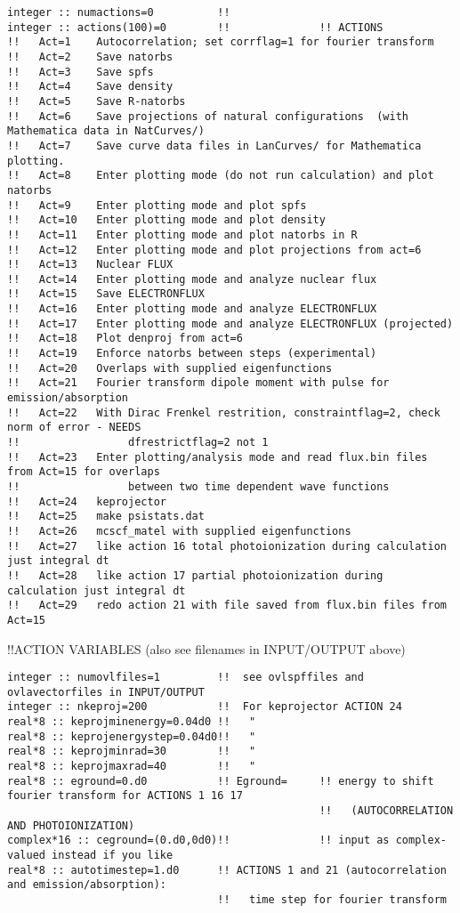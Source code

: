 \begin{verbatim}
integer :: numactions=0          !! 
integer :: actions(100)=0        !!              !! ACTIONS
!!   Act=1    Autocorrelation; set corrflag=1 for fourier transform
!!   Act=2    Save natorbs
!!   Act=3    Save spfs
!!   Act=4    Save density
!!   Act=5    Save R-natorbs
!!   Act=6    Save projections of natural configurations  (with Mathematica data in NatCurves/)
!!   Act=7    Save curve data files in LanCurves/ for Mathematica plotting.
!!   Act=8    Enter plotting mode (do not run calculation) and plot natorbs 
!!   Act=9    Enter plotting mode and plot spfs
!!   Act=10   Enter plotting mode and plot density
!!   Act=11   Enter plotting mode and plot natorbs in R
!!   Act=12   Enter plotting mode and plot projections from act=6
!!   Act=13   Nuclear FLUX 
!!   Act=14   Enter plotting mode and analyze nuclear flux
!!   Act=15   Save ELECTRONFLUX
!!   Act=16   Enter plotting mode and analyze ELECTRONFLUX 
!!   Act=17   Enter plotting mode and analyze ELECTRONFLUX (projected)
!!   Act=18   Plot denproj from act=6
!!   Act=19   Enforce natorbs between steps (experimental)
!!   Act=20   Overlaps with supplied eigenfunctions
!!   Act=21   Fourier transform dipole moment with pulse for emission/absorption
!!   Act=22   With Dirac Frenkel restrition, constraintflag=2, check norm of error - NEEDS
!!                 dfrestrictflag=2 not 1
!!   Act=23   Enter plotting/analysis mode and read flux.bin files from Act=15 for overlaps
!!                 between two time dependent wave functions
!!   Act=24   keprojector
!!   Act=25   make psistats.dat
!!   Act=26   mcscf_matel with supplied eigenfunctions 
!!   Act=27   like action 16 total photoionization during calculation just integral dt
!!   Act=28   like action 17 partial photoionization during calculation just integral dt
!!   Act=29   redo action 21 with file saved from flux.bin files from Act=15
\end{verbatim}
!!{\large \quad ACTION VARIABLES (also see filenames in INPUT/OUTPUT above)}
\begin{verbatim}
integer :: numovlfiles=1         !!  see ovlspffiles and ovlavectorfiles in INPUT/OUTPUT
integer :: nkeproj=200           !!  For keprojector ACTION 24
real*8 :: keprojminenergy=0.04d0 !!   "
real*8 :: keprojenergystep=0.04d0!!   "
real*8 :: keprojminrad=30        !!   "
real*8 :: keprojmaxrad=40        !!   "
real*8 :: eground=0.d0           !! Eground=     !! energy to shift fourier transform for ACTIONS 1 16 17
                                                 !!   (AUTOCORRELATION AND PHOTOIONIZATION)
complex*16 :: ceground=(0.d0,0d0)!!              !! input as complex-valued instead if you like
real*8 :: autotimestep=1.d0      !! ACTIONS 1 and 21 (autocorrelation and emission/absorption):
                                 !!   time step for fourier transform
\end{verbatim}
